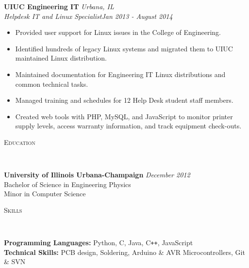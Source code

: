 \documentclass{article}
\newenvironment{changemargin}[2]{%
  \begin{list}{}{%
    \setlength{\topsep}{0pt}%
    \setlength{\leftmargin}{#1}%
    \setlength{\rightmargin}{#2}%
    \setlength{\listparindent}{\parindent}%
    \setlength{\itemindent}{\parindent}%
    \setlength{\parsep}{\parskip}%
  }%
  \item[]}{\end{list}
}
\newcommand{\lineover}{
	\begin{changemargin}{-0.05in}{-0.05in}
		\vspace*{-8pt}
		\hrulefill \\
		\vspace*{-2pt}
	\end{changemargin}
}
\newcommand{\header}[1]{
	\begin{changemargin}{-0.5in}{-0.5in}
		\scshape{#1}\\
  	\lineover
	\end{changemargin}
}
\newenvironment{body} {
	\vspace*{-16pt}
	\begin{changemargin}{-0.25in}{-0.5in}
  }	
	{\end{changemargin}
}
\begin{document}
\begin{body}
	\textbf{UIUC Engineering IT} \hfill \emph{Urbana, IL}\\
	\emph{Helpdesk IT and Linux Specialist}\hfill \emph{Jan 2013 - August 2014}\\

	\begin{itemize} \itemsep -0pt  %
		\item Provided user support for Linux issues in the College of Engineering.
		\item Identified hundreds of legacy Linux systems and migrated them to UIUC maintained Linux distribution.
		\item Maintained documentation for Engineering IT Linux distributions and common technical tasks.
		\item Managed training and schedules for 12 Help Desk student staff members.
		\item Created web tools with PHP, MySQL, and JavaScript to monitor printer supply levels, access warranty information, and track equipment check-outs.
	\end{itemize}

\end{body}

\header{Education}
\vspace{14pt}
\begin{body}

	\textbf{University of Illinois Urbana-Champaign} \hfill \emph{December 2012}{} \\
	\hspace{4ex} Bachelor of Science in Engineering Physics \\
	\hspace{4ex} Minor in Computer Science\\
\end{body}

\header{Skills}

\begin{body}
	\vspace{14pt}
	\textbf{Programming Languages:}{} Python, C, Java, C{}\verb!++!, JavaScript\\%
	\textbf{Technical Skills:}{} PCB design, Soldering, Arduino \& AVR Microcontrollers, Git \& SVN\\
\end{body}

\smallskip

\end{document}
